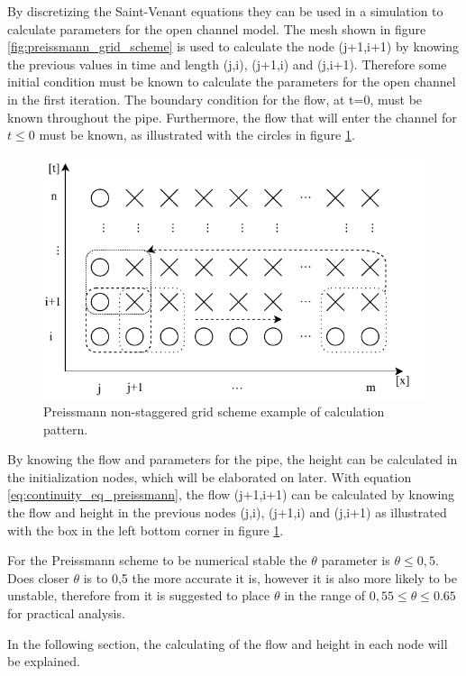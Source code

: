 By discretizing the Saint-Venant equations they can be used in a simulation to calculate parameters for the open channel model. The mesh shown in figure \ref{fig:preissmann_grid_scheme} is used to calculate the node (j+1,i+1) by knowing the previous values in time and length (j,i), (j+1,i) and (j,i+1). Therefore some initial condition must be known to calculate the parameters for the open channel in the first iteration. The boundary condition for the flow, at t=0, must be known throughout the pipe. Furthermore, the flow that will enter the channel for $t\leq 0$ must be known, as illustrated with the circles in figure \ref{fig:preissmann_grid_scheme_exampel}.

\begin{figure}[H]
\centering
\includegraphics[width=.75\textwidth]{report/simulation/pictures/preissmann_scheme_iteration}
\caption{Preissmann non-staggered grid scheme example of calculation pattern.}
\label{fig:preissmann_grid_scheme_exampel}
\end{figure}
By knowing the flow and parameters for the pipe, the height can be calculated in the initialization nodes, which will be elaborated on later. With equation \ref{eq:continuity_eq_preissmann}, the flow (j+1,i+1) can be calculated by knowing the flow and height in the previous nodes (j,i), (j+1,i) and (j,i+1) as illustrated with the box in the left bottom corner in figure \ref{fig:preissmann_grid_scheme_exampel}.

For the Preissmann scheme to be numerical stable the $\theta$ parameter is $\theta \leq 0,5$. Does closer $\theta$ is to 0,5 the more accurate it is, however it is also more likely to be unstable, therefore from \cite{theta_decision} it is suggested to place $\theta$ in the range of $0,55 \leq \theta \leq 0.65$ for practical analysis.

In the following section, the calculating of the flow and height in each node will be explained.


